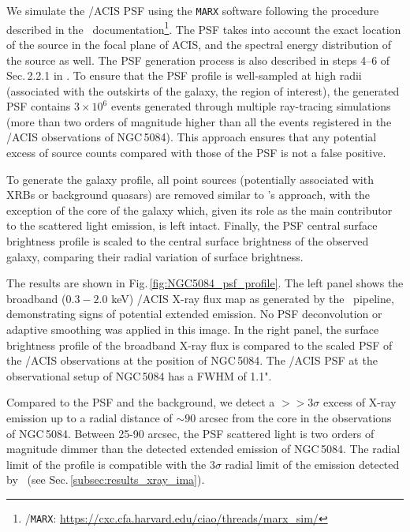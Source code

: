 \documentclass[modern]{CORE-AAS/aastex631}
\begin{document}
{We simulate the \Chandra/ACIS PSF using the \texttt{MARX} software following the procedure described in the \ciao\ documentation\footnote{\ciao/\texttt{MARX}: \url{https://cxc.cfa.harvard.edu/ciao/threads/marx_sim/}}. The PSF takes into account the exact location of the source in the focal plane of ACIS, and the spectral energy distribution of the source as well. The PSF generation process is also described in steps 4--6 of Sec.\,2.2.1 in \citet{borlaff+2024apj967_169}. To ensure that the PSF profile is well-sampled at high radii (associated with the outskirts of the galaxy, the region of interest), the generated PSF contains $3\times10^6$ events generated through multiple ray-tracing simulations (more than two orders of magnitude higher than all the events registered in the \Chandra/ACIS observations of NGC\,5084). This approach ensures that any potential excess of source counts compared with those of the PSF is not a false positive.

To generate the galaxy profile, all point sources (potentially associated with XRBs or background quasars) are removed similar to \SAUNAS's approach, with the exception of the core of the galaxy which, given its role as the main contributor to the scattered light emission, is left intact. Finally, the PSF central surface brightness profile is scaled to the central surface brightness of the observed galaxy, comparing their radial variation of surface brightness.

The results are shown in Fig.\,\ref{fig:NGC5084_psf_profile}. The left panel shows the broadband ($0.3-2.0$ keV) \Chandra/ACIS X-ray flux map as generated by the \ciao\ pipeline, demonstrating signs of potential extended emission. No PSF deconvolution or adaptive smoothing was applied in this image. In the right panel, the surface brightness profile of the broadband X-ray flux is compared to the scaled PSF of the \Chandra/ACIS observations at the position of NGC\,5084. The \Chandra/ACIS PSF at the observational setup of NGC\,5084 has a FWHM of 1.1".

Compared to the PSF and the background, we detect a $>>3\sigma$ excess of X-ray emission up to a radial distance of $\sim90$ arcsec from the core in the observations of NGC\,5084. Between 25-90 arcsec, the PSF scattered light is two orders of magnitude dimmer than the detected extended emission of NGC\,5084. The radial limit of the profile is compatible with the $3\sigma$ radial limit of the emission detected by \SAUNAS\ (see Sec.\,\ref{subsec:results_xray_ima}).

}
\end{document}
